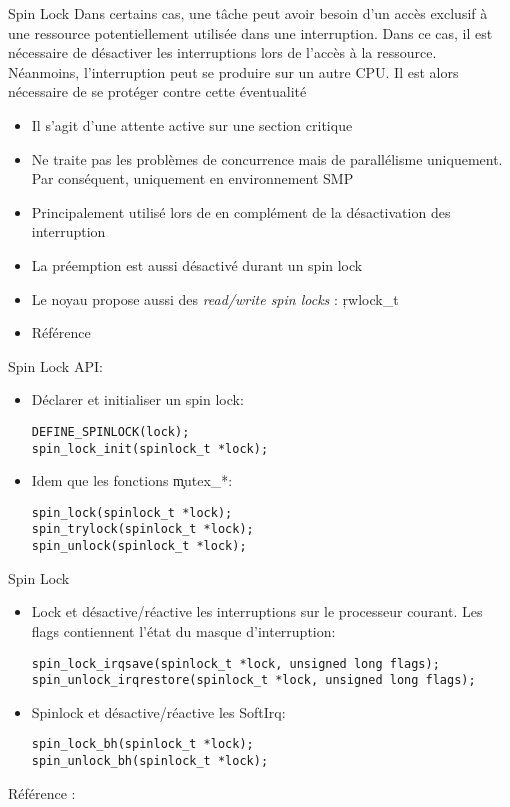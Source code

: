 \begin{frame}[fragile=singleslide]{Spin Lock}
  Dans certains cas, une tâche peut avoir besoin d'un accès exclusif à
  une ressource  potentiellement utilisée dans  une interruption. Dans
  ce cas,  il est nécessaire  de désactiver les interruptions  lors de
  l'accès à la ressource.   Néanmoins, l'interruption peut se produire
  sur un  autre CPU.   Il est alors  nécessaire de se  protéger contre
  cette éventualité
  \begin{itemize} 
  \item Il s'agit d'une attente active sur une section critique
  \item  Ne   traite  pas  les   problèmes  de  concurrence   mais  de
    parallélisme    uniquement.   Par   conséquent,    uniquement   en
    environnement SMP
  \item   Principalement  utilisé   lors  de   en  complément   de  la
    désactivation des interruption
  \item La préemption est aussi désactivé durant un spin lock
  \item  Le  noyau propose  aussi  des  \emph{read/write spin locks}  :
    \c{rwlock_t} 
  \item Référence 
  \end{itemize}  
\end{frame}

\begin{frame}[fragile=singleslide]{Spin Lock}
  API:
  \begin{itemize}
  \item Déclarer et initialiser un spin lock:
    \begin{lstlisting} 
DEFINE_SPINLOCK(lock);
spin_lock_init(spinlock_t *lock);
    \end{lstlisting} 
  \item Idem que les fonctions \c{mutex_*}:
    \begin{lstlisting} 
spin_lock(spinlock_t *lock);
spin_trylock(spinlock_t *lock);
spin_unlock(spinlock_t *lock);
    \end{lstlisting} 
  \end{itemize}  
\end{frame}

\begin{frame}[fragile=singleslide]{Spin Lock}
  \begin{itemize}
  \item Lock et désactive/réactive les interruptions sur le processeur
    courant.  Les flags contiennent l'état du masque d'interruption:
    \begin{lstlisting} 
spin_lock_irqsave(spinlock_t *lock, unsigned long flags);
spin_unlock_irqrestore(spinlock_t *lock, unsigned long flags);
    \end{lstlisting} 
  \item Spinlock et désactive/réactive les SoftIrq:
    \begin{lstlisting} 
spin_lock_bh(spinlock_t *lock);
spin_unlock_bh(spinlock_t *lock);
    \end{lstlisting} 
  \end{itemize}
  Référence :  
\end{frame}

